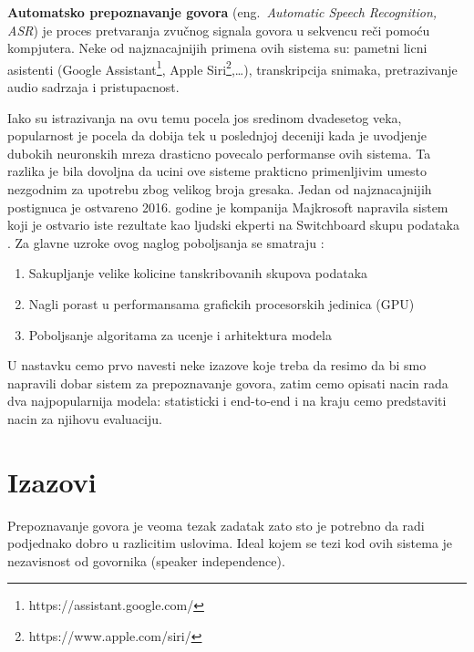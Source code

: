 \documentclass[a4paper]{article}
\begin{document}
\textbf{Automatsko prepoznavanje govora} (eng.~{\em Automatic Speech Recognition, ASR}) je proces pretvaranja zvučnog signala govora u sekvencu reči pomoću kompjutera.
Neke od najznacajnijih primena ovih sistema su: pametni licni asistenti (Google Assistant\footnote{https://assistant.google.com/}, Apple Siri\footnote{https://www.apple.com/siri/},\dots), transkripcija snimaka, pretrazivanje audio sadrzaja i pristupacnost.

Iako su istrazivanja na ovu temu pocela jos sredinom dvadesetog veka, popularnost je pocela da dobija tek u poslednjoj deceniji kada je uvodjenje dubokih neuronskih mreza drasticno povecalo performanse ovih sistema.
Ta razlika je bila dovoljna da ucini ove sisteme prakticno primenljivim umesto nezgodnim za upotrebu zbog velikog broja gresaka.
Jedan od najznacajnijih postignuca je ostvareno 2016. godine je kompanija Majkrosoft napravila sistem koji je ostvario iste rezultate kao ljudski ekperti na Switchboard skupu podataka \cite{switchboard}.
Za glavne uzroke ovog naglog poboljsanja se smatraju \cite{hannun2021history}:
\begin{enumerate}
  \item Sakupljanje velike kolicine tanskribovanih skupova podataka
  \item Nagli porast u performansama grafickih procesorskih jedinica (GPU)
  \item Poboljsanje algoritama za ucenje i arhitektura modela
\end{enumerate}

U nastavku cemo prvo navesti neke izazove koje treba da resimo da bi smo napravili dobar sistem za prepoznavanje govora, zatim cemo opisati nacin rada dva najpopularnija modela: statisticki i end-to-end i na kraju cemo predstaviti nacin za njihovu evaluaciju.

\section{Izazovi}
Prepoznavanje govora je veoma tezak zadatak zato sto je potrebno da radi podjednako dobro u razlicitim uslovima. %
Ideal kojem se tezi kod ovih sistema je nezavisnost od govornika (speaker independence).
\end{document}
